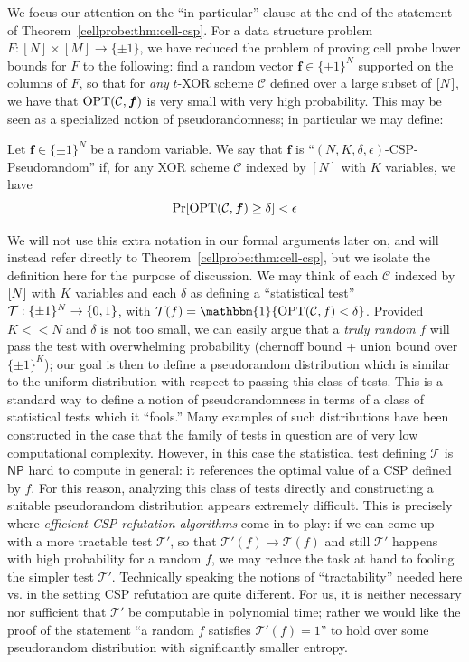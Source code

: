We focus our attention on the ``in particular'' clause at the end of the statement of Theorem~\ref{cellprobe:thm:cell-csp}. For a data structure problem $F: [N] \times [M] \to \{\pm 1\}$, we have reduced the problem of proving cell probe lower bounds for $F$ to the following: find a random vector $\bm{f} \in \{\pm 1\}^N$ supported on the columns of $F$, so that for \emph{any} $t$-XOR scheme $\mathcal{C}$ defined over a large subset of $[N]$, we have that $\mathrm{OPT}(\mathcal{C},\bm{f})$ is very small with very high probability. 
This may be seen as a specialized notion of pseudorandomness; in particular we may define:
\begin{definition}\label{cellprobe:def:csp-pseudo}
Let $\bm{f} \in \{\pm 1\}^N$ be a random variable. We say that $\bm{f}$ is ``$(N,K,\delta,\epsilon)$-CSP-Pseudorandom'' if, for any XOR scheme $\mathcal{C}$ indexed by $[N]$ with $K$ variables, we have
\[
\Pr[\mathrm{OPT}(\mathcal{C},\bm{f}) \geq \delta] < \epsilon
\]
\end{definition}
We will not use this extra notation in our formal arguments later on, and will instead refer directly to Theorem~\ref{cellprobe:thm:cell-csp}, but we isolate the definition here for the purpose of discussion. We may think of each $\mathcal{C}$ indexed by $[N]$ with $K$ variables and each $\delta$ as defining a ``statistical test'' $\mathcal{T}: \{\pm 1\}^N \to \{0,1\}$, with $\mathcal{T}(f) = \mathbbm{1}\{ \Opt(\mathcal{C},f) < \delta\}$. Provided $K << N$ and $\delta$ is not too small, we can easily argue that a \emph{truly random} $f$ will pass the test with overwhelming probability (chernoff bound + union bound over $\{\pm 1\}^K$); our goal is then to define a pseudorandom distribution which is similar to the uniform distribution with respect to passing this class of tests. This is a standard way to define a notion of pseudorandomness in terms of a class of statistical tests which it ``fools.'' Many examples of such distributions have been constructed in the case that the family of tests in question are of very low computational complexity. However, in this case the statistical test defining $\mathcal{T}$ is $\mathsf{NP}$ hard to compute in general: it references the optimal value of a CSP defined by $f$. For this reason, analyzing this class of tests directly and constructing a suitable pseudorandom distribution appears extremely difficult. This is precisely where \emph{efficient CSP refutation algorithms} come in to play: if we can come up with a more tractable test $\mathcal{T}'$, so that $\mathcal{T}'(f) \rightarrow \mathcal{T}(f)$ and still $\mathcal{T}'$ happens with high probability for a random $f$, we may reduce the task at hand to fooling the simpler test $\mathcal{T}'$. Technically speaking the notions of ``tractability'' needed here vs. in the setting CSP refutation are quite different. For us, it is neither necessary nor sufficient that $\mathcal{T}'$ be computable in polynomial time; rather we would like the proof of the statement ``a random $f$ satisfies $\mathcal{T}'(f)=1$'' to hold over some pseudorandom distribution with significantly smaller entropy. 

